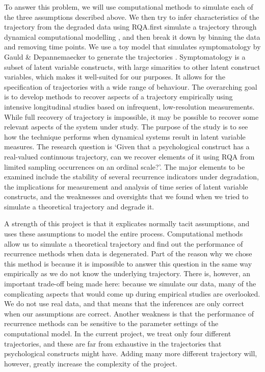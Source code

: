 \documentclass[utf8]{FrontiersinVancouver}
\begin{document}
To answer this problem, we will use computational methods to simulate each of the three assumptions described above. We then try to infer characteristics of the trajectory from the degraded data using RQA.\@We first simulate a trajectory through dynamical computational modelling \citep{grahekAnatomyPsychologicalTheory2021,gauldDynamicalSystemsComputational2023}, and then break it down by binning the data and removing time points. We use a toy model that simulates symptomatology by Gauld \& Depannemaecker to generate the trajectories \citep{gauldDynamicalSystemsComputational2023}. Symptomatology is a subset of latent variable constructs, with large simarities to other latent construct variables, which makes it well-suited for our purposes. It allows for the specification of trajectories with a wide range of behaviour. The overarching goal is to develop methods to recover aspects of a trajectory empirically using intensive longitudinal studies based on infrequent, low-resolution measurements. While full recovery of trajectory is impossible, it may be possible to recover some relevant aspects of the system under study. The purpose of the study is to see how the technique performs when dynamical systems result in latent variable measures. The research question is `Given that a psychological construct has a real-valued continuous trajectory, can we recover elements of it using RQA from limited sampling occurrences on an ordinal scale?'. The major elements to be examined include the stability of several recurrence indicators under degradation, the implications for measurement and analysis of time series of latent variable constructs, and the weaknesses and oversights that we found when we tried to simulate a theoretical trajectory and degrade it.  

A strength of this project is that it explicates normally tacit assumptions, and uses these assumptions to model the entire process. Computational methods allow us to simulate a theoretical trajectory and find out the performance of recurrence methods when data is degenerated. Part of the reason why we chose this method is because it is impossible to answer this question in the same way empirically as we do not know the underlying trajectory. There is, however, an important trade-off being made here: because we simulate our data, many of the complicating aspects that would come up during empirical studies are overlooked. We do not use real data, and that means that the inferences are only correct when our assumptions are correct. Another weakness is that the performance of recurrence methods can be sensitive to the parameter settings of the computational model. In the current project, we treat only four different trajectories, and these are far from exhaustive in the trajectories that psychological constructs might have. Adding many more different trajectory will, however, greatly increase the complexity of the project. 
\end{document}
